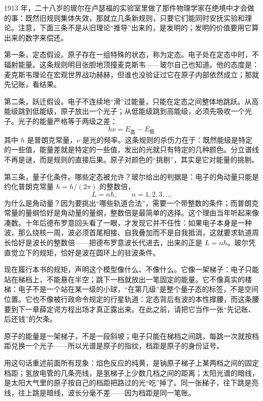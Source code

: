 \begin{mainline}
1913 年，二十八岁的玻尔在卢瑟福的实验室里做了那件物理学家在绝境中才会做的事：既然旧规则集体失效，那就立几条新规则，只要它们能同时安抚实验和理论。注意，下面三条不是从旧理论“推导”出来的，是发明的；发明的价值要用它算出来的数字来偿还。

第一条，定态假设。原子存在一组特殊的状态，称为定态。电子处在定态中时，不辐射能量。这条规则明目张胆地顶撞麦克斯韦——玻尔自己也知道。他的态度是：麦克斯韦理论在宏观世界战功赫赫，但谁也没验证过它在原子内部依然成立；那就先记账，看结果。

第二条，跃迁假设。电子不连续地“滑”过能量，只能在定态之间整体地跳跃。从高能级跳到低能级，原子放出一个光子；从低能级跳到高能级，必须先吸收一个光子。光子的能量严格等于两级之差：
\[
h\nu = E_{\text{高}}-E_{\text{低}}
\]
其中 \(h\) 是普朗克常量，\(\nu\) 是光的频率。这条规则的杀伤力在于：既然能级是特定的一些值，能量差就是特定的一些值，发出的光就只有特定的几种颜色。分立谱线不再是谜，而是规则的直接后果。原子对颜色的“挑剔”，其实是它对能量的挑剔。

第三条，量子化条件。哪些定态被允许？玻尔给出的判据是：电子的角动量只能是约化普朗克常量 \(\hbar=h/(2\pi)\) 的整数倍，
\[
L = n\hbar,\qquad n=1,2,3,\dots
\]
为什么是角动量？因为要挑出“哪些轨道合法”，需要一个带整数的条件；而普朗克常量的量纲恰好是角动量的量纲，整数倍是最简单的选择。这个理由当年听起来像凑数。十年后德布罗意回头看了一眼，才发现它并不任性：如果电子本身是一种波，那么绕核一周，波必须首尾相接、自我叠加而不是自我抵消，这就要求轨道周长恰好是波长的整数倍——把德布罗意波长代进去，出来的正是 \(L=n\hbar\)。玻尔凭直觉立下的规矩，恰好是波在圆环上的驻波条件。

现在履行本书的规矩，声明这个模型像什么、不像什么。它像一架梯子：电子只能站在梯档上，不能悬在半空；跳下一档就放出一笔固定的能量。它不像真实的楼梯：电子不是一个站在某一级的小球，“在第几级”是整个量子态的标签，不是空间位置。它也不像被行政命令规定的行星轨道：定态背后有波的本性撑腰，而这条腰要到下一章薛定谔方程出场才真正露出来。在此之前，请把它当作一张“先记账、后还钱”的欠条。
\end{mainline}


\begin{oneline}
原子的能量是一架梯子，不是一段斜坡；电子只能在梯档之间跳，每跳一次就按档距兑换一个光子——所以光谱是原子的指纹，档距是原子的身份证号。
\end{oneline}

\begin{mainline}
用这句话重述前面所有现象：焰色反应的纯黄，是钠原子梯子上某两档之间的固定档距；氢放电管的几条亮线，是氢梯子上少数几档之间的距离；太阳光谱的暗线，是太阳大气里的原子按自己的档距把路过的光“吃”掉了。同一张梯子，往下跳是亮线，往上跳是暗线，波长分毫不差——因为档距是同一笔账。
\end{mainline}

